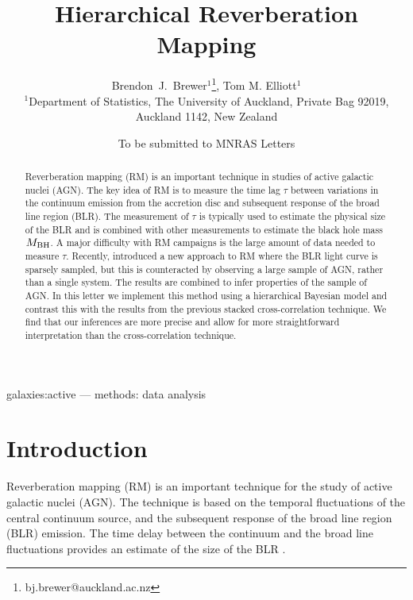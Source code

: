 \documentclass[useAMS,usenatbib]{mn2e}
\title[Hierarchical Reverberation Mapping]
{Hierarchical Reverberation Mapping}
\author[Brewer and Elliott]{%
  Brendon~J.~Brewer$^{1}$\thanks{bj.brewer@auckland.ac.nz},
  Tom M. Elliott$^{1}$
  \medskip\\
  $^1$Department of Statistics, The University of Auckland, Private Bag 92019, Auckland 1142, New Zealand}
\begin{document}
             
\date{To be submitted to MNRAS Letters}
             
\maketitle

\label{firstpage}


\begin{abstract}
Reverberation mapping (RM) is an important technique in studies of active
galactic nuclei (AGN). The key idea of RM is to measure the time lag $\tau$
between variations in the continuum emission from the accretion disc
and subsequent response of the broad line region (BLR). The measurement of
$\tau$ is typically used to estimate the physical size of the BLR and is
combined with other measurements to estimate the black hole mass $M_{\rm BH}$.
A major difficulty with RM campaigns is the large amount of data needed to
measure $\tau$. Recently, \citet{2012MNRAS.427.2701F} introduced a new approach
to RM where the BLR light curve is sparsely sampled, but this is counteracted
by observing a large sample of AGN, rather than a single system.
The results are combined to infer properties of the sample of
AGN. In this letter we implement this method using a hierarchical
Bayesian model and contrast this with the results from the previous stacked
cross-correlation technique. We find that our inferences are more precise and
allow for more straightforward interpretation than the cross-correlation
technique.
\end{abstract}
galaxies:active --- methods: data analysis
\begin{keywords}

\end{keywords}


\section{Introduction}
Reverberation mapping (RM) is an important technique for the study
of active galactic nuclei (AGN). The technique is based on the temporal
fluctuations of the central continuum source, and the subsequent response
of the broad line region (BLR) emission. The time delay between the continuum
and the broad line fluctuations provides an estimate of the size of the BLR
\citep{peterson}.
\end{document}
